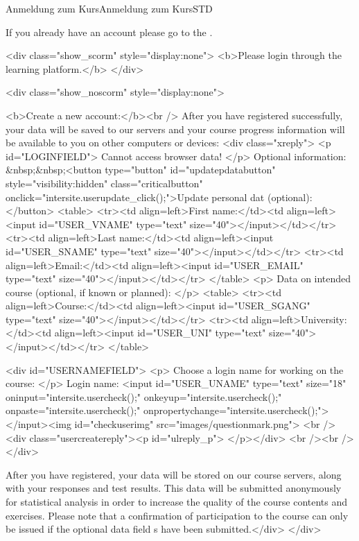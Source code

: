 \begin{MXContent}{Anmeldung zum Kurs}{Anmeldung zum Kurs}{STD}
\MGlobalConfTag
{}

If you already have an account please go to the .

\begin{html}
<div class="show_scorm" style="display:none">
<b>Please login through the learning platform.</b>
</div>
\end{html}

\begin{html}
<div class="show_noscorm" style="display:none">

<b>Create a new account:</b><br />
After you have registered successfully, your data will be saved to our servers
and your course progress information will be available to you on other
computers or devices:
<div class="xreply">
<p id="LOGINFIELD">
Cannot access browser data!
</p>
Optional information: &nbsp;&nbsp;<button type="button" id="updatepdatabutton"
style="visibility:hidden" class="criticalbutton"
onclick="intersite.userupdate_click();">Update personal dat (optional):</button>
<table>
  <tr><td align=left>First name:</td><td align=left><input id="USER_VNAME" type="text" size="40"></input></td></tr>
  <tr><td align=left>Last name:</td><td align=left><input id="USER_SNAME" type="text" size="40"></input></td></tr>
  <tr><td align=left>Email:</td><td align=left><input id="USER_EMAIL" type="text" size="40"></input></td></tr>
</table>
<p>
Data on intended course (optional, if known or planned):
</p>
<table>
  <tr><td align=left>Course:</td><td align=left><input id="USER_SGANG"
  type="text" size="40"></input></td></tr> <tr><td align=left>University:</td><td align=left><input id="USER_UNI" type="text" size="40"></input></td></tr>
</table>

<div id="USERNAMEFIELD">
<p>
Choose a login name for working on the course:
</p>
Login name: <input id="USER_UNAME" type="text" size="18" oninput="intersite.usercheck();" onkeyup="intersite.usercheck();" onpaste="intersite.usercheck();" onpropertychange="intersite.usercheck();"></input><img id="checkuserimg" src="images/questionmark.png">
<br />
<div class="usercreatereply"><p id="ulreply_p"> </p></div>
<br /><br />
</div>

After you have registered, your data will be stored on our course servers, along
with your responses and test results. This data will be submitted anonymously
for statistical analysis in order to increase the quality of the course contents
and exercises. Please note that a confirmation of participation to the course
can only be issued if the optional data field s have been submitted.</div>
</div>
\end{html}


\end{MXContent}
